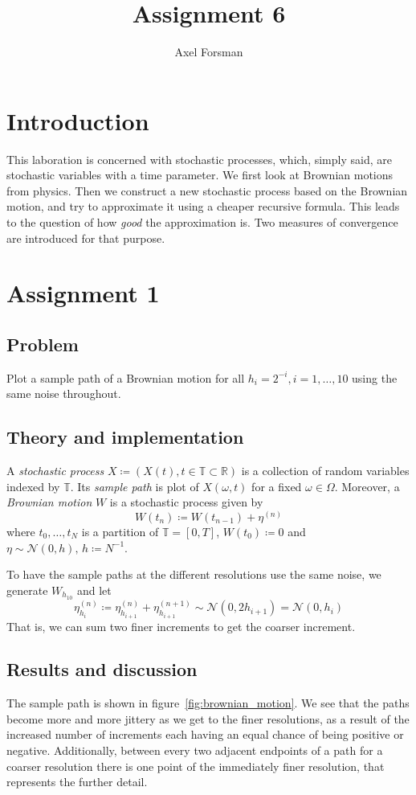 \documentclass[11pt, a4paper]{article}
\title{Assignment 6}
\author{Axel Forsman}
\begin{document}
\maketitle

\section{Introduction}
This laboration is concerned with stochastic processes,
which, simply said, are stochastic variables with a time parameter.
We first look at Brownian motions from physics.
Then we construct a new stochastic process based on the Brownian motion,
and try to approximate it using a cheaper recursive formula.
This leads to the question of how \emph{good} the approximation is.
Two measures of convergence are introduced for that purpose.

\section{Assignment 1}\label{sec:brownian_motion}
\subsection{Problem}
Plot a sample path of a Brownian motion for all $h_i = 2^{-i}, i = 1, \ldots, 10$
using the same noise throughout.
\subsection{Theory and implementation}
A \emph{stochastic process} $X \coloneqq (X(t), t \in \mathbb T \subset \mathbb R)$
is a collection of random variables indexed by $\mathbb T$.
Its \emph{sample path} is plot of $X(\omega, t)$ for a fixed $\omega \in \Omega$.
Moreover,
a \emph{Brownian motion} $W$ is a stochastic process given by
$$ W(t_n) \coloneqq W(t_{n-1}) + \eta^{(n)} $$
where $t_0, \ldots, t_N$ is a partition of $\mathbb T = [0, T]$,
$W(t_0) \coloneqq 0$ and $\eta \sim \mathcal N(0, h), \, h \coloneqq N^{-1}$.

To have the sample paths at the different resolutions use the same noise,
we generate $W_{h_{10}}$ and let
$$ \eta_{h_i}^{(n)} \coloneqq \eta_{h_{i+1}}^{(n)} + \eta_{h_{i+1}}^{(n+1)} \sim \mathcal N(0, 2h_{i+1})
	= \mathcal N(0, h_i) $$
That is, we can sum two finer increments to get the coarser increment.
\subsection{Results and discussion}
The sample path is shown in figure~\ref{fig:brownian_motion}.
We see that the paths become more and more jittery as we get to the finer resolutions,
as a result of the increased number of increments
each having an equal chance of being positive or negative.
Additionally, between every two adjacent endpoints of a path for a coarser resolution
there is one point of the immediately finer resolution,
that represents the further detail.
\end{document}
